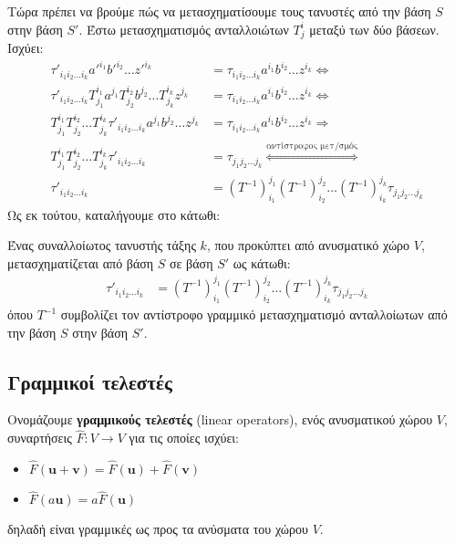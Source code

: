 \documentclass[main.tex]{subfiles}
\begin{document}
	Τώρα πρέπει να βρούμε πώς να μετασχηματίσουμε τους τανυστές από την βάση $S$ στην βάση $S'$. Έστω μετασχηματισμός ανταλλοιώτων $T^i_j$ μεταξύ των δύο βάσεων. Ισχύει:
	\begin{align*}
		\tau'_{i_1i_2\ldots i_k}a'^{i_1}b'^{i_2}\ldots z'^{i_k} &= \tau_{i_1i_2\ldots i_k}a^{i_1}b^{i_2}\ldots z^{i_k} \Leftrightarrow \\
		\tau'_{i_1i_2\ldots i_k}T^{i_1}_{j_1}a^{j_1}T^{i_2}_{j_2}b^{j_2}\ldots T^{i_k}_{j_k}z^{j_k} &=  \tau_{i_1i_2\ldots i_k}a^{i_1}b^{i_2}\ldots z^{i_k} \Leftrightarrow \\
		T^{i_1}_{j_1}T^{i_2}_{j_2}\ldots T^{i_k}_{j_k}\tau'_{i_1i_2\ldots i_k}a^{j_1}b^{j_2}\ldots z^{j_k} &= \tau_{i_1i_2\ldots i_k}a^{i_1}b^{i_2}\ldots z^{i_k} \Rightarrow\\
		T^{i_1}_{j_1}T^{i_2}_{j_2}\ldots T^{i_k}_{j_k}\tau'_{i_1i_2\ldots i_k} &= \tau_{j_1j_2\ldots j_k} \overset{\text{αντίστροφος μετ/σμός}}{\Leftrightarrow}\\
		\tau'_{i_1i_2\ldots i_k} &= (T^{-1})^{j_1}_{i_1}(T^{-1})^{j_2}_{i_2}\ldots(T^{-1})^{j_k}_{i_k}\tau_{j_1j_2\ldots j_k}
	\end{align*}
	Ως εκ τούτου, καταλήγουμε στο κάτωθι:
	\begin{theorem}
		Ένας συναλλοίωτος τανυστής τάξης $k$, που προκύπτει από ανυσματικό χώρο $V$, μετασχηματίζεται από βάση $S$ σε βάση $S'$ ως κάτωθι:
		\begin{align*}
			\tau'_{i_1i_2\ldots i_k} &= (T^{-1})^{j_1}_{i_1}(T^{-1})^{j_2}_{i_2}\ldots(T^{-1})^{j_k}_{i_k}\tau_{j_1j_2\ldots j_k}
		\end{align*}
		όπου $T^{-1}$ συμβολίζει τον αντίστροφο γραμμικό μετασχηματισμό ανταλλοίωτων από την βάση $S$ στην βάση $S'$.
	\end{theorem}

	\subsection{Γραμμικοί τελεστές}
	
	\begin{definition}
		Ονομάζουμε \textbf{γραμμικούς τελεστές} (linear operators), ενός ανυσματικού χώρου $V$, συναρτήσεις ${\hat{F}:V\rightarrow V}$ για τις οποίες ισχύει:
		\begin{itemize}
			\item $\hat{F}(\boldsymbol{u} + \boldsymbol{v}) = \hat{F}(\boldsymbol{u}) + \hat{F}(\boldsymbol{v})$ 
			\item $\hat{F}(a\boldsymbol{u}) = a\hat{F}(\boldsymbol{u})$
		\end{itemize}
		δηλαδή είναι γραμμικές ως προς τα ανύσματα του χώρου $V$.
	\end{definition}
\end{document}
